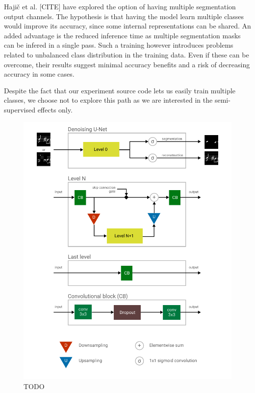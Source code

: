 Hajič et al. [CITE] have explored the option of having multiple segmentation output channels. The hypothesis is that having the model learn multiple classes would improve its accuracy, since some internal representations can be shared. An added advantage is the reduced inference time as multiple segmentation masks can be infered in a single pass. Such a training however introduces problems related to unbalanced class distribution in the training data. Even if these can be overcome, their results suggest minimal accuracy benefits and a risk of decreasing accuracy in some cases.

Despite the fact that our experiment source code lets us easily train multiple classes, we choose not to explore this path as we are interested in the semi-supervised effects only.

\begin{figure}[p]
    \centering
    \includegraphics[width=140mm]{../img/architecture-pieces.pdf}
    \caption{TODO}
    \label{fig:ArchitecturePieces}
\end{figure}

